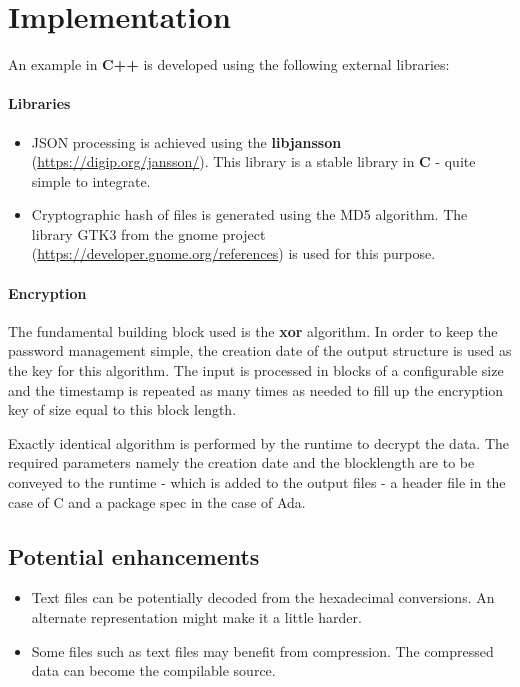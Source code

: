 \documentclass[12pt, a4paper]{article} %
\begin{document}
\section{Implementation}

An example in \textbf{C++} is developed using the following external libraries:
\paragraph{Libraries}
\begin{itemize}
    \item JSON processing is achieved using the \textbf{libjansson} (\url{https://digip.org/jansson/}). This library is a stable library in \textbf{C} - quite simple to integrate.
    \item Cryptographic hash of files is generated using the MD5 algorithm. The library GTK3 from the gnome project (\url{https://developer.gnome.org/references}) is used for this purpose.
\end{itemize}

\paragraph{Encryption}
The fundamental building block used is the \textbf{xor} algorithm. In order to keep the password management simple, the creation date of the output structure is used as the key for this algorithm. The input is processed in blocks of a configurable size and the timestamp is repeated as many times as needed to fill up the encryption key of size equal to this block length.

Exactly identical algorithm is performed by the runtime to decrypt the data. The required parameters namely the creation date and the blocklength are to be conveyed to the runtime - which is added to the output files - a header file in the case of C and a package spec in the case of Ada.

\paragraph{}

\subsection{Potential enhancements}
\begin{itemize}
    \item Text files can be potentially decoded from the hexadecimal conversions. An alternate representation might make it a little harder.
    \item Some files such as text files may benefit from compression. The compressed data can become the compilable source. 
\end{itemize}
\end{document}
